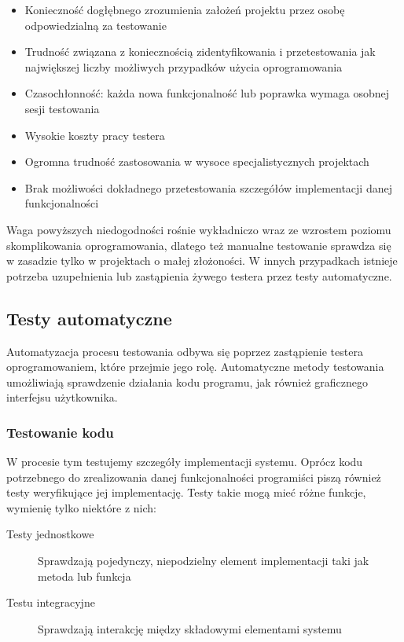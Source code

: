   	  \begin{itemize}
  	    \item Konieczność dogłębnego zrozumienia założeń projektu przez osobę odpowiedzialną za testowanie
  	    \item Trudność związana z koniecznością zidentyfikowania i przetestowania jak największej liczby możliwych przypadków użycia oprogramowania
  	    \item Czasochłonność: każda nowa funkcjonalność lub poprawka wymaga osobnej sesji testowania
  	   	\item Wysokie koszty pracy testera
  	   	\item Ogromna trudność zastosowania w wysoce specjalistycznych projektach
  	   	\item Brak możliwości dokładnego przetestowania szczegółów implementacji danej funkcjonalności
  	  \end{itemize}
	  
  	  Waga powyższych niedogodności rośnie wykładniczo wraz ze wzrostem poziomu skomplikowania oprogramowania, dlatego też manualne testowanie sprawdza się w zasadzie tylko w projektach o małej złożoności. W innych przypadkach istnieje potrzeba uzupełnienia lub zastąpienia żywego testera przez testy automatyczne.
	  
	  \subsection{Testy automatyczne}
	    Automatyzacja procesu testowania odbywa się poprzez zastąpienie testera oprogramowaniem, które przejmie jego rolę. Automatyczne metody testowania umożliwiają sprawdzenie działania kodu programu, jak również graficznego interfejsu użytkownika.
	    \subsubsection{Testowanie kodu}
	    
	      W procesie tym testujemy szczegóły implementacji systemu. Oprócz kodu potrzebnego do zrealizowania danej funkcjonalności programiści piszą również testy weryfikujące jej implementację. Testy takie mogą mieć różne funkcje, wymienię tylko niektóre z nich:
	      
	      \begin{description}
	        \item[Testy jednostkowe] Sprawdzają pojedynczy, niepodzielny element implementacji taki jak metoda lub funkcja
	        \item[Testu integracyjne] Sprawdzają interakcję między składowymi elementami systemu
        \end{description}
        
